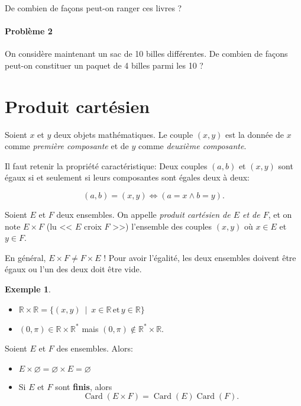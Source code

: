 \documentclass[11pt]{article}
\newcommand{\R}{\mathbb R}
\DeclareMathOperator{\Card}{\mathrm{Card}}
\theoremstyle{definition}
\newtheorem{exe}{Exemple}
\theoremstyle{remark}
\theoremstyle{theorem}
\begin{document}
De combien de façons peut-on ranger ces livres ?



\paragraph{Problème 2} On considère maintenant un sac de 10 billes différentes. De combien de façons peut-on constituer un paquet de 4 billes parmi les 10 ?

\section{Produit cartésien}

\begin{defn}
	Soient $x$ et $y$ deux objets mathématiques. Le couple $(x,y)$ est la donnée de $x$ comme \textit{première composante} et de $y$ comme \textit{deuxième composante}.
	
	Il faut retenir la propriété caractéristique:
	Deux couples $(a,b)$ et $(x,y)$ sont égaux si et seulement si leurs composantes sont égales deux à deux:
	
	\[
	(a,b) = (x,y) \Longleftrightarrow (a=x\land b=y).
	\]
\end{defn}

\begin{defn}
Soient $E$ et $F$ deux ensembles. On appelle \textit{produit cartésien de $E$ et de $F$}, et on note $E\times F$ (lu << $E$ croix $F$ >>) l'ensemble des couples $(x,y)$ où $x\in E$ et $y\in F$.
\end{defn}

\begin{rem}
En général, $E\times F\neq F\times E$ ! Pour avoir l'égalité, les deux ensembles doivent être égaux ou l'un des deux doit être vide.
\end{rem}

\begin{exe}\leavevmode
\begin{itemize}
\item $\R\times\R = \{(x,y)\ \mid\ x\in\R\,\text{et}\,y\in\R \}$
\item $(0,\pi)\in\R\times\R^*$ mais $(0,\pi)\not\in \R^*\times\R$.
\end{itemize}
\end{exe}

\begin{prop}
	Soient $E$ et $F$ des ensembles. Alors:
	\begin{itemize}
		\item $E\times\varnothing=\varnothing\times E=\varnothing$
		\item Si $E$ et $F$ sont \textbf{finis}, alors
		\[
		\Card(E\times F) = \Card(E)\Card(F). 
		\]
	\end{itemize}
\end{prop}
\end{document}
